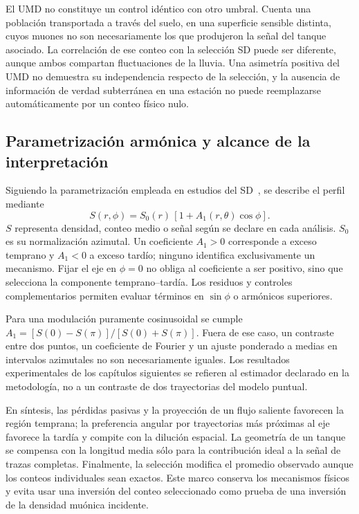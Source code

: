 El UMD no constituye un control idéntico con otro umbral. Cuenta una población transportada a través del suelo, en una superficie sensible distinta, cuyos muones no son necesariamente los que produjeron la señal del tanque asociado. La correlación de ese conteo con la selección SD puede ser diferente, aunque ambos compartan fluctuaciones de la lluvia. Una asimetría positiva del UMD no demuestra su independencia respecto de la selección, y la ausencia de información de verdad subterránea en una estación no puede reemplazarse automáticamente por un conteo físico nulo.

\subsection{Parametrización armónica y alcance de la interpretación}
\label{subsec:parametrizacion}

Siguiendo la parametrización empleada en estudios del SD~\cite{Billoir2002,BradfieldThesis}, se describe el perfil mediante
\begin{equation}
S(r,\phi)=S_0(r)\,[1+A_1(r,\theta)\cos\phi].
\label{eq:asimetria_a1}
\end{equation}
$S$ representa densidad, conteo medio o señal según se declare en cada análisis. $S_0$ es su normalización azimutal. Un coeficiente $A_1>0$ corresponde a exceso temprano y $A_1<0$ a exceso tardío; ninguno identifica exclusivamente un mecanismo. Fijar el eje en $\phi=0$ no obliga al coeficiente a ser positivo, sino que selecciona la componente temprano--tardía. Los residuos y controles complementarios permiten evaluar términos en $\sin\phi$ o armónicos superiores.

Para una modulación puramente cosinusoidal se cumple $A_1=[S(0)-S(\pi)]/[S(0)+S(\pi)]$. Fuera de ese caso, un contraste entre dos puntos, un coeficiente de Fourier y un ajuste ponderado a medias en intervalos azimutales no son necesariamente iguales. Los resultados experimentales de los capítulos siguientes se refieren al estimador declarado en la metodología, no a un contraste de dos trayectorias del modelo puntual.

En síntesis, las pérdidas pasivas y la proyección de un flujo saliente favorecen la región temprana; la preferencia angular por trayectorias más próximas al eje favorece la tardía y compite con la dilución espacial. La geometría de un tanque se compensa con la longitud media sólo para la contribución ideal a la señal de trazas completas. Finalmente, la selección modifica el promedio observado aunque los conteos individuales sean exactos. Este marco conserva los mecanismos físicos y evita usar una inversión del conteo seleccionado como prueba de una inversión de la densidad muónica incidente.

\newpage
